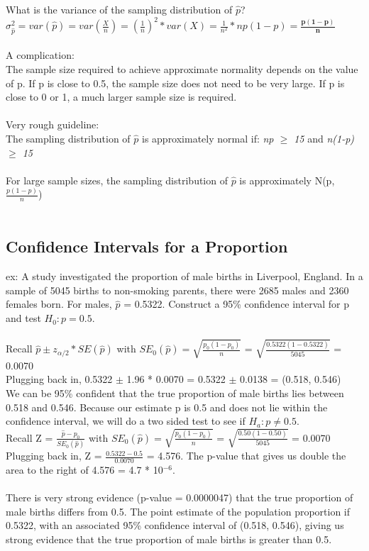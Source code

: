 \documentclass[12pt, a4paper]{article}
\begin{document}
	What is the variance of the sampling distribution of $\hat{p}$? \\
	$\sigma_{\hat{p}}^2 = var(\hat{p}) = var(\frac{X}{n}) = (\frac{1}{n})^2*var(X) = \frac{1}{n^2} * np(1-p) = \bm{\frac{p(1-p)}{n}}$ \\~\\
	A complication: \\
	The sample size required to achieve approximate normality depends on the value of p. If p is close to 0.5, the sample size does not need to be very large. If p is close to 0 or 1, a much larger sample size is required. \\~\\
	Very rough guideline:\\
	The sampling distribution of $\hat{p}$ is approximately normal if: \textit{np $\geq$ 15} and \textit{n(1-p) $\geq$ 15} \\~\\
	For large sample sizes, the sampling distribution of $\hat{p}$ is approximately N(p,$\frac{p(1-p)}{n}$) \\~\\
	
	\subsection{Confidence Intervals for a Proportion}
	ex: A study investigated the proportion of male births in Liverpool, England. In a sample of 5045 births to non-smoking parents, there were 2685 males and 2360 females born. For males, $\hat{p}$ = 0.5322. Construct a 95\% confidence interval for p and test $H_0: p = 0.5$. \\~\\
	Recall $\hat{p} \pm z_{\alpha/2} * SE(\hat{p})$ with $SE_0(\hat{p}) = \sqrt{\frac{p_0(1-p_0)}{n}}$ = $\sqrt{\frac{0.5322(1-0.5322)}{5045}}$ = 0.0070 \\
	Plugging back in, 0.5322 $\pm$ 1.96 * 0.0070 = 0.5322 $\pm$ 0.0138 = (0.518, 0.546) \\
	We can be 95\% confident that the true proportion of male births lies between 0.518 and 0.546. Because our estimate p is 0.5 and does not lie within the confidence interval, we will do a two sided test to see if $H_a: p \neq 0.5$. \\
	Recall Z = $\frac{\hat{p} - p_0}{SE_0(\hat{p})}$ with $SE_0(\hat{p}) = \sqrt{\frac{p_0(1-p_0)}{n}}$ = $\sqrt{\frac{0.50(1-0.50)}{5045}}$ = 0.0070 \\
	Plugging back in, Z = $\frac{0.5322 - 0.5}{0.0070}$ = 4.576. The p-value that gives us double the area to the right of 4.576 = 4.7 * 10$^{-6}$. \\~\\ There is very strong evidence (p-value = 0.0000047) that the true proportion of male births differs from 0.5. The point estimate of the population proportion if 0.5322, with an associated 95\% confidence interval of (0.518, 0.546), giving us strong evidence that the true proportion of male births is greater than 0.5. \newpage
	
\end{document}
